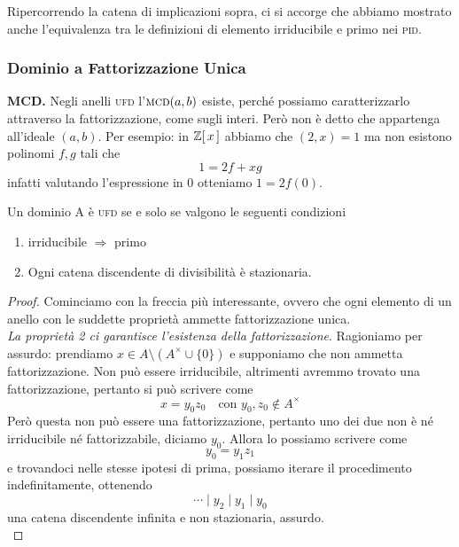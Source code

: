 \begin{multicols}{2}
\begin{remark}
	Ripercorrendo la catena di implicazioni sopra, ci si accorge che abbiamo mostrato anche l'equivalenza tra le definizioni di elemento irriducibile e primo  nei \textsc{pid}.
\end{remark}

\subsubsection{Dominio a Fattorizzazione Unica}

\textbf{MCD.} Negli anelli \textsc{ufd} l'$ \textsc{mcd}(a, b) $ esiste, perché possiamo caratterizzarlo attraverso la fattorizzazione, come sugli interi. Però non è detto che appartenga all'ideale $ (a, b) $. Per esempio: in $ \mathbb{Z}[\,x\,] $ abbiamo che $ (2, x) = 1 $ ma non esistono polinomi $ f, g $ tali che
\[ 1 = 2f + xg \]
infatti valutando l'espressione in $ 0 $ otteniamo $ 1 = 2f(0) $.

\begin{theorem} \label{carufd}
	Un dominio A è \textsc{ufd} se e solo se valgono le seguenti condizioni
	\begin{enumerate}
		\item irriducibile $ \Rightarrow $ primo
		\item Ogni catena discendente di divisibilità è stazionaria.
	\end{enumerate}
\end{theorem}

\begin{proof}
	Cominciamo con la freccia più interessante, ovvero che ogni elemento di un anello con le suddette proprietà ammette fattorizzazione unica. \\
	
	\emph{La proprietà 2 ci garantisce l'esistenza della fattorizzazione}. Ragioniamo per assurdo: prendiamo $ x \in A\setminus(A^\times \cup \{0\}) $ e supponiamo che non ammetta fattorizzazione. Non può essere irriducibile, altrimenti avremmo trovato una fattorizzazione, pertanto si può scrivere come
	\[ x = y_0z_0 \quad\text{con } y_0, z_0 \notin A^\times \]
	Però questa non può essere una fattorizzazione, pertanto uno dei due non è né irriducibile né fattorizzabile, diciamo $ y_0 $. Allora lo possiamo scrivere come
	\[ y_0 = y_1 z_1 \]
	e trovandoci nelle stesse ipotesi di prima, possiamo iterare il procedimento indefinitamente, ottenendo
	\[ \cdots \mid y_2 \mid y_1 \mid y_0 \]
	una catena discendente infinita e non stazionaria, assurdo.\\
	

\end{proof}
\end{multicols}
